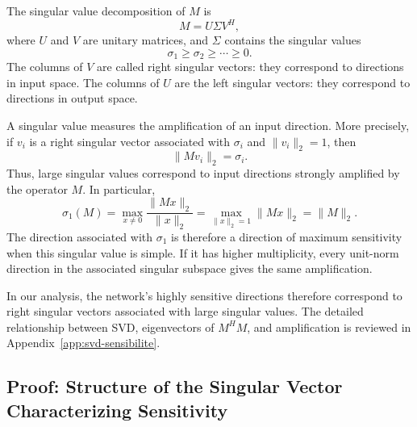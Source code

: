The singular value decomposition of $M$ is
\[
    M = U\Sigma V^H,
\]
where $U$ and $V$ are unitary matrices, and $\Sigma$ contains the singular values
\[
    \sigma_1 \geq \sigma_2 \geq \cdots \geq 0.
\]
The columns of $V$ are called right singular vectors: they correspond to directions
in input space. The columns of $U$ are the left singular vectors: they correspond
to directions in output space.

A singular value measures the amplification of an input direction. More precisely, if $v_i$ is
a right singular vector associated with $\sigma_i$ and $\|v_i\|_2=1$, then
\[
    \|Mv_i\|_2 = \sigma_i.
\]
Thus, large singular values correspond to input directions strongly amplified by
the operator $M$. In particular,
\[
\sigma_1(M)
= \max_{x \neq 0} \frac{\|Mx\|_2}{\|x\|_2}
= \max_{\|x\|_2 = 1} \|Mx\|_2
= \|M\|_2.
\]
The direction associated with $\sigma_1$ is therefore a direction of maximum sensitivity when this singular
value is simple. If it has higher multiplicity, every unit-norm direction in the associated singular subspace
gives the same amplification.

In our analysis, the network's highly sensitive directions therefore correspond to
right singular vectors associated with large singular values. The detailed relationship between SVD,
eigenvectors of $M^H M$, and amplification is reviewed in Appendix~\ref{app:svd-sensibilite}.

\subsection{Proof: Structure of the Singular Vector Characterizing Sensitivity}

